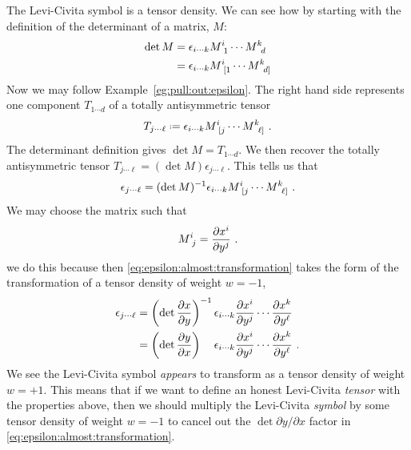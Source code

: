 \begin{subappendices}
The Levi-Civita symbol is a tensor density. We can see how by starting with the definition of the determinant of a matrix, $M$:
\begin{align}
    \det M &=\epsilon_{i\cdots k} M\aij{i}{1}\cdots M\aij{k}{d}
    \\
    & =\epsilon_{i\cdots k} M\aij{i}{[1}\cdots M\aij{k}{d]}
\end{align}
Now we may follow Example~\ref{eg:pull:out:epsilon}. The right hand side represents one component $T_{1\cdots d}$ of a totally antisymmetric tensor
\begin{align}
    T_{j\cdots \ell}
    \defeq
    \epsilon_{i\cdots k} M\aij{i}{[j}\cdots M\aij{k}{\ell]} \ .
\end{align}
The determinant definition gives $\det M = T_{1\cdots d}$. We then recover the totally antisymmetric tensor $T_{j\cdots \ell} = (\det M) \epsilon_{j\cdots \ell}$. This tells us that 
\begin{align}
    \epsilon_{j\cdots \ell} = (\det M)\inv 
    \epsilon_{i\cdots k} M\aij{i}{[j}\cdots M\aij{k}{\ell]} \ .
    \label{eq:epsilon:almost:transformation}
\end{align}
We may choose the matrix such that
\begin{align}
    M\aij{i}{j} = \frac{\partial x^i}{\partial y^j} \ .
\end{align}
we do this because then \eqref{eq:epsilon:almost:transformation} takes the form of the transformation of a tensor density of weight $w=-1$,
\begin{align}
    \epsilon_{j\cdots \ell} &= 
    \left(\det \frac{\partial x}{\partial y}\right)\inv 
    \epsilon_{i\cdots k} \frac{\partial x^i}{\partial y^j} \cdots \frac{\partial x^k}{\partial y^\ell} 
    \\
    &= \left(\det \frac{\partial y}{\partial x}\right)\phantom{\inv}
    \epsilon_{i\cdots k} \frac{\partial x^i}{\partial y^j} \cdots \frac{\partial x^k}{\partial y^\ell} 
    \ .
    \label{eq:epsilon:almost:transformation:dx:dy}
\end{align}
We see the Levi-Civita symbol \emph{appears} to transform as a tensor density of weight $w=+1$. This means that if we want to define an honest Levi-Civita \emph{tensor} with the properties above, then we should multiply the Levi-Civita \emph{symbol} by some tensor density of weight $w=-1$ to cancel out the $\det \partial y/\partial x$ factor in \eqref{eq:epsilon:almost:transformation}.


\end{subappendices}
